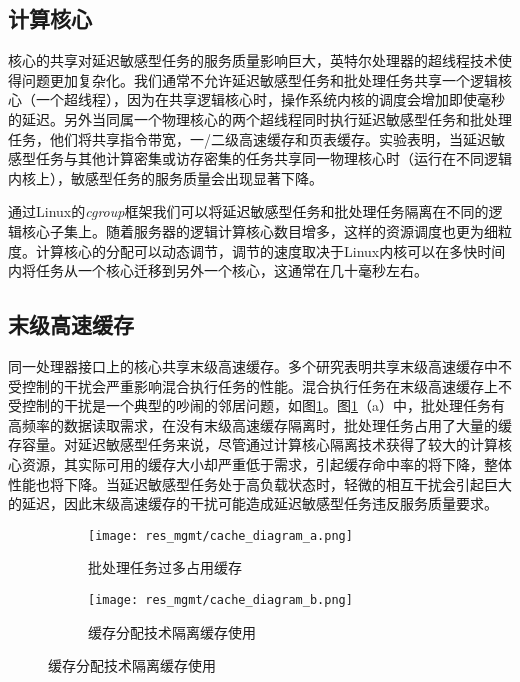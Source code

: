 \subsection{计算核心}
核心的共享对延迟敏感型任务的服务质量影响巨大\cite{lo2015heracles}，英特尔处理器的超线程技术使得问题更加复杂化。我们通常不允许延迟敏感型任务和批处理任务共享一个逻辑核心（一个超线程），因为在共享逻辑核心时，操作系统内核的调度会增加即使毫秒的延迟\cite{leverich2014reconciling}。另外当同属一个物理核心的两个超线程同时执行延迟敏感型任务和批处理任务，他们将共享指令带宽，一/二级高速缓存和页表缓存。实验表明，当延迟敏感型任务与其他计算密集或访存密集的任务共享同一物理核心时（运行在不同逻辑内核上），敏感型任务的服务质量会出现显著下降\cite{lo2015heracles}。

通过Linux的\textit{cgroup}框架\cite{menage2008cgroups}我们可以将延迟敏感型任务和批处理任务隔离在不同的逻辑核心子集上。随着服务器的逻辑计算核心数目增多，这样的资源调度也更为细粒度。计算核心的分配可以动态调节，调节的速度取决于Linux内核可以在多快时间内将任务从一个核心迁移到另外一个核心，这通常在几十毫秒左右。

\subsection{末级高速缓存}
同一处理器接口上的核心共享末级高速缓存。多个研究表明共享末级高速缓存中不受控制的干扰会严重影响混合执行任务的性能\cite{delimitrou2014quasar}\cite{govindan2011cuanta}\cite{leverich2014reconciling}\cite{mars2012increasing}\cite{sanchez2011vantage}。混合执行任务在末级高速缓存上不受控制的干扰是一个典型的吵闹的邻居问题，如图\ref{fig:cache_diagram}。图\ref{fig:cache_diagram}（a）中，批处理任务有高频率的数据读取需求，在没有末级高速缓存隔离时，批处理任务占用了大量的缓存容量。对延迟敏感型任务来说，尽管通过计算核心隔离技术获得了较大的计算核心资源，其实际可用的缓存大小却严重低于需求，引起缓存命中率的将下降，整体性能也将下降。当延迟敏感型任务处于高负载状态时，轻微的相互干扰会引起巨大的延迟\cite{kasture2014ubik}，因此末级高速缓存的干扰可能造成延迟敏感型任务违反服务质量要求。

\begin{figure}
  \centering
  \begin{subfigure}{0.4\textwidth}
    \centering
    \texttt{[image: res\_mgmt/cache\_diagram\_a.png]}
    \caption{批处理任务过多占用缓存}
  \end{subfigure}
  \hspace{3em}
  \begin{subfigure}{0.4\textwidth}
    \centering
    \texttt{[image: res\_mgmt/cache\_diagram\_b.png]}
    \caption{缓存分配技术隔离缓存使用}
  \end{subfigure}
  \label{fig:cache_diagram}
\end{figure}


